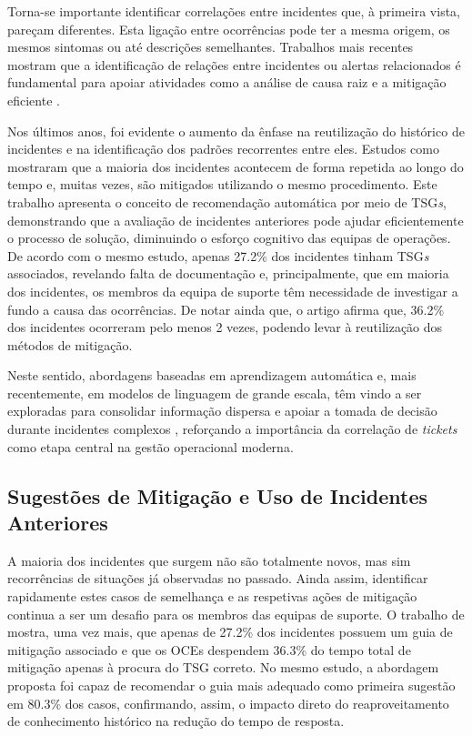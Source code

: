 		Torna-se importante identificar correlações entre incidentes que, à primeira vista, pareçam diferentes. Esta ligação entre ocorrências pode ter a mesma origem, os mesmos sintomas ou até descrições semelhantes. Trabalhos mais recentes mostram que a identificação de relações entre incidentes ou alertas relacionados é fundamental para apoiar atividades como a análise de causa raiz e a mitigação eficiente \autocite{Reference2,Reference1}.
		
		Nos últimos anos, foi evidente o aumento da ênfase na reutilização do histórico de incidentes e na identificação dos padrões recorrentes entre eles. Estudos como \textcite{Reference2} mostraram que a maioria dos incidentes acontecem de forma repetida ao longo do tempo e, muitas vezes, são mitigados utilizando o mesmo procedimento. Este trabalho apresenta o conceito de recomendação automática por meio de \gls{TSG}\textit{s}, demonstrando que a avaliação de incidentes anteriores pode ajudar eficientemente o processo de solução, diminuindo o esforço cognitivo das equipas de operações. De acordo com o mesmo estudo, apenas 27.2\% dos incidentes tinham \gls{TSG}\textit{s} associados, revelando falta de documentação e, principalmente, que em maioria dos incidentes, os membros da equipa de suporte têm necessidade de investigar a fundo a causa das ocorrências. De notar ainda que, o artigo afirma que, 36.2\% dos incidentes ocorreram pelo menos 2 vezes, podendo levar à reutilização dos métodos de mitigação.
	
		Neste sentido, abordagens baseadas em aprendizagem automática e, mais recentemente, em modelos de linguagem de grande escala, têm vindo a ser exploradas para consolidar informação dispersa e apoiar a tomada de decisão durante incidentes complexos \autocite{Reference4,Reference5}, reforçando a importância da correlação de \textit{tickets} como etapa central na gestão operacional moderna.
	
	
	\subsection{Sugestões de Mitigação e Uso de Incidentes Anteriores}
	
		A maioria dos incidentes que surgem não são totalmente novos, mas sim recorrências de situações já observadas no passado. Ainda assim, identificar rapidamente estes casos de semelhança e as respetivas ações de mitigação continua a ser um desafio para os membros das equipas de suporte. O trabalho de \textcite{Reference2} mostra, uma vez mais, que apenas de 27.2\% dos incidentes possuem um guia de mitigação associado e que os \gls{OCEs} despendem 36.3\% do tempo total de mitigação apenas à procura do \gls{TSG} correto. No mesmo estudo, a abordagem proposta foi capaz de recomendar o guia mais adequado como primeira sugestão em 80.3\% dos casos, confirmando, assim, o impacto direto do reaproveitamento de conhecimento histórico na redução do tempo de resposta.
		
